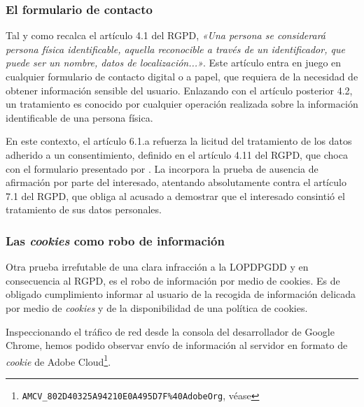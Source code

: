\documentclass[es]{uc3mreport}
\begin{document}
\begin{report}
        \newpage
        \subsubsection{El formulario de contacto}
        Tal y como recalca el artículo 4.1 del RGPD, \textit{«Una persona se considerará persona física identificable, aquella reconocible a través de un identificador, que puede ser un nombre, datos de localización...»}. Este artículo entra en juego en cualquier formulario de contacto digital o a papel, que requiera de la necesidad de obtener información sensible del usuario. Enlazando con el artículo posterior 4.2, un tratamiento es conocido por cualquier operación realizada sobre la información identificable de una persona física.

        En este contexto, el artículo 6.1.a refuerza la licitud del tratamiento de los datos adherido a un consentimiento, definido en el artículo 4.11 del RGPD, que choca con el formulario presentado por \cite{benji}. La  incorpora la prueba de ausencia de afirmación por parte del interesado, atentando absolutamente contra el artículo 7.1 del RGPD, que obliga al acusado a demostrar que el interesado consintió el tratamiento de sus datos personales.

        \subsubsection{Las \textit{cookies} como robo de información}
        Otra prueba irrefutable de una clara infracción a la LOPDPGDD y en consecuencia al RGPD, es el robo de información por medio de cookies. Es de obligado cumplimiento informar al usuario de la recogida de información delicada por medio de \textit{cookies} y de la disponibilidad de una política de cookies. 
        
        Inspeccionando el tráfico de red desde la consola del desarrollador de Google Chrome, hemos podido observar envío de información al servidor en formato de \textit{cookie} de Adobe Cloud\footnote{\texttt{AMCV\_802D40325A94210E0A495D7F\%40AdobeOrg}, véase }.


\end{report}
\end{document}
